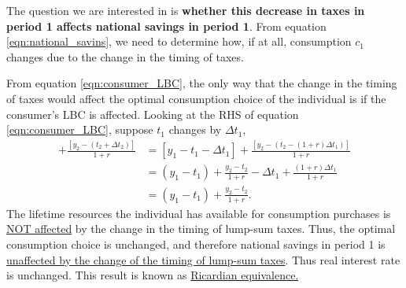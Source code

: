 \documentclass[10pt]{article}
\begin{document}
The question we are interested in is 
{\textbf {whether this decrease in taxes in period 1 affects national savings in period 1}}.
From equation \eqref{eqn:national_savins}, we need to determine how, if at all, consumption
$ c_1 $ changes due to the change in the timing of taxes.

From equation \eqref{eqn:consumer_LBC}, the only way that the change in the timing of taxes would 
affect the optimal consumption choice of the individual is if the consumer's LBC is affected.
Looking at the RHS of equation \eqref{eqn:consumer_LBC}, suppose $ t_1 $ changes by $ \Delta t_1 $,
\begin{align*}
		[y_1 - (t_1 + \Delta t_1)] + \frac{[y_2 - (t_2 + \Delta t_2)]}{1 + r}
		&= [y_1 - t_1 - \Delta t_1] + \frac{[y_2 - (t_2 - (1 + r) \Delta t_1)]}{1 + r}\\
		&= (y_1 - t_1) + \frac{y_2 - t_2}{1 + r} - \Delta t_1 + \frac{(1 + r) \Delta t_1}{1 + r}\\
		&= (y_1 - t_1) + \frac{y_2 - t_2}{1 + r}.
\end{align*}
The lifetime resources the individual has available for consumption purchases is 
{\underline {NOT affected}} by the change in the timing of lump-sum taxes. Thus, the optimal
consumption choice is unchanged, and therefore national savings in period 1 is 
{\underline {unaffected by the change of the timing of lump-sum taxes}}. Thus real interest rate
is unchanged. This result is known as {\underline {Ricardian equivalence.}}

\noindent{}\\
\end{document}
